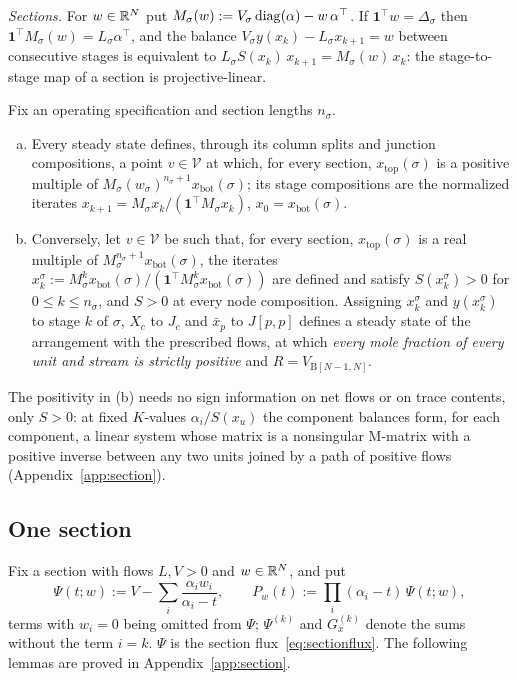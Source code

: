 \documentclass[11pt,a4paper]{report}
\newcommand{\cV}{\mathcal V}
\newcommand{\one}{\mathbf 1}
\newcommand{\Bs}{\mathrm B}
\newcommand{\xb}{x_{\mathrm{bot}}}
\newcommand{\xt}{x_{\mathrm{top}}}
\begin{document}
\emph{Sections.} For \(w\in\mathbb{R}^N\) put \(M_\sigma(w):=V_\sigma\operatorname{diag}(\alpha)-w\,\alpha^\top\). If \(\one^\top w=\Delta_\sigma\) then
\(\one^\top M_\sigma(w)=L_\sigma\alpha^\top\), and the balance \(V_\sigma y(x_k)-L_\sigma x_{k+1}=w\) between consecutive stages is
equivalent to \(L_\sigma S(x_k)\,x_{k+1}=M_\sigma(w)\,x_k\): the stage-to-stage map of a section is projective-linear.

\begin{proposition}\label{prop:exact}
Fix an operating specification and section lengths \(n_\sigma\).
\begin{enumerate}[(a)]
\item Every steady state defines, through its column splits and junction compositions, a point \(v\in\cV\) at which, for
every section, \(\xt(\sigma)\) is a positive multiple of \(M_\sigma(w_\sigma)^{n_\sigma+1}\xb(\sigma)\); its stage compositions
are the normalized iterates \(x_{k+1}=M_\sigma x_k/(\one^\top M_\sigma x_k)\), \(x_0=\xb(\sigma)\).
\item Conversely, let \(v\in\cV\) be such that, for every section, \(\xt(\sigma)\) is a real multiple of
\(M_\sigma^{n_\sigma+1}\xb(\sigma)\), the iterates \(x^\sigma_k:=M_\sigma^k\xb(\sigma)/(\one^\top M_\sigma^k\xb(\sigma))\) are
defined and satisfy \(S(x^\sigma_k)>0\) for \(0\le k\le n_\sigma\), and \(S>0\) at every node composition. Assigning \(x^\sigma_k\)
and \(y(x^\sigma_k)\) to stage \(k\) of \(\sigma\), \(X_c\) to \(J_c\) and \(\bar x_p\) to \(J[p,p]\) defines a steady state of the
arrangement with the prescribed flows, at which \emph{every mole fraction of every unit and stream is strictly positive}
and \(R=V_{\Bs[N-1,N]}\).
\end{enumerate}
\end{proposition}

The positivity in (b) needs no sign information on net flows or on trace contents, only \(S>0\): at fixed
\(K\)-values \(\alpha_i/S(x_u)\) the component balances form, for each component, a linear system whose matrix is a
nonsingular M-matrix with a positive inverse between any two units joined by a path of positive flows
(Appendix~\ref{app:section}).

\subsection{One section}\label{sec:onesection}

Fix a section with flows \(L,V>0\) and \(w\in\mathbb{R}^N\), and put
\[\Psi(t;w):=V-\sum_i\frac{\alpha_iw_i}{\alpha_i-t},\qquad P_w(t):=\prod_i(\alpha_i-t)\,\Psi(t;w),\]
terms with \(w_i=0\) being omitted from \(\Psi\); \(\Psi^{(k)}\) and \(G^{(k)}_x\) denote the sums without the term \(i=k\). \(\Psi\) is the
section flux~\eqref{eq:sectionflux}. The following lemmas are proved in Appendix~\ref{app:section}.
\end{document}
